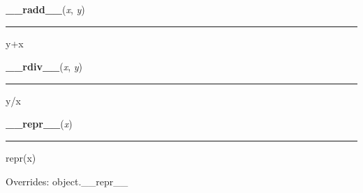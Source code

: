     \vspace{0.5ex}

\hspace{.8\funcindent}\begin{boxedminipage}{\funcwidth}

    \raggedright \textbf{\_\_radd\_\_}(\textit{x}, \textit{y})

    \vspace{-1.5ex}

    \rule{\textwidth}{0.5\fboxrule}
\setlength{\parskip}{2ex}
    y+x

\setlength{\parskip}{1ex}
    \end{boxedminipage}

    \label{pygame:Color:__rdiv__}

    \vspace{0.5ex}

\hspace{.8\funcindent}\begin{boxedminipage}{\funcwidth}

    \raggedright \textbf{\_\_rdiv\_\_}(\textit{x}, \textit{y})

    \vspace{-1.5ex}

    \rule{\textwidth}{0.5\fboxrule}
\setlength{\parskip}{2ex}
    y/x

\setlength{\parskip}{1ex}
    \end{boxedminipage}

    \vspace{0.5ex}

\hspace{.8\funcindent}\begin{boxedminipage}{\funcwidth}

    \raggedright \textbf{\_\_repr\_\_}(\textit{x})

    \vspace{-1.5ex}

    \rule{\textwidth}{0.5\fboxrule}
\setlength{\parskip}{2ex}
    repr(x)

\setlength{\parskip}{1ex}
      Overrides: object.\_\_repr\_\_

    \end{boxedminipage}

    \label{pygame:Color:__rfloordiv__}

    \vspace{0.5ex}

